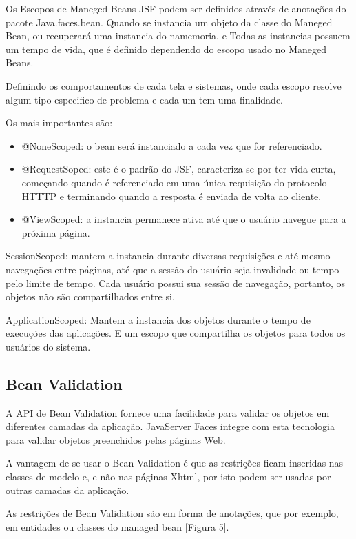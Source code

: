 \documentclass[	DIV=calc,%
							paper=a4,%
							fontsize=12pt,%
							onecolumn]{scrartcl}	 					%
\begin{document}
Os Escopos de Maneged Beans JSF podem ser definidos através de anotações do pacote Java.faces.bean. Quando se instancia um objeto da classe do Maneged Bean, ou recuperará uma instancia do namemoria. e Todas as instancias possuem um tempo de vida, que é definido dependendo do escopo usado no Maneged Beans.

Definindo os comportamentos de cada tela e sistemas, onde cada escopo resolve algum tipo especifico de problema e cada um tem uma finalidade.

Os mais importantes são:

\begin{itemize}
\item @NoneScoped: o bean será instanciado a cada vez que for referenciado.
\item @RequestSoped: este é o padrão do JSF, caracteriza-se por ter vida curta, começando quando é referenciado em uma única requisição do protocolo HTTTP e terminando quando a resposta é enviada de volta ao cliente.
\item @ViewScoped: a instancia permanece ativa até que o usuário navegue para a próxima página.
\end{itemize}

SessionScoped: mantem a instancia durante diversas requisições e até mesmo navegações entre páginas, até que a sessão do usuário seja invalidade ou tempo pelo limite de tempo. Cada usuário possui sua sessão de navegação, portanto, os objetos não são compartilhados entre si.

ApplicationScoped: Mantem a instancia dos objetos durante o tempo de execuções das aplicações. E um escopo que compartilha os objetos para todos os usuários do sistema.

\subsection{Bean Validation}

A API de Bean Validation fornece uma facilidade para validar os objetos em diferentes camadas da aplicação. JavaServer Faces integre com esta tecnologia para validar objetos preenchidos pelas páginas Web.

A vantagem de se usar o Bean Validation é que as restrições ficam inseridas nas classes de modelo e, e não nas páginas Xhtml, por isto podem ser usadas por outras camadas da aplicação.

As restrições de Bean Validation são em forma de anotações, que por exemplo, em entidades ou classes do managed bean [Figura 5].
\end{document}

